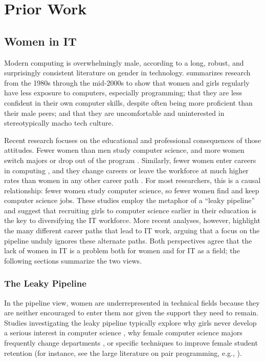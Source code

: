 \section{Prior Work}\label{lit-review}
\subsection{Women in IT}\label{lit-review-gender}
Modern computing is overwhelmingly male, according to a long, robust, and surprisingly consistent literature on gender in technology. \citet{Sanders2005Gender} summarizes research from the 1980s through the mid-2000s to show that women and girls regularly have less exposure to computers, especially programming; that they are less confident in their own computer skills, despite often being more proficient than their male peers; and that they are uncomfortable and uninterested in stereotypically macho tech culture.

Recent research focuses on the educational and professional consequences of those attitudes. Fewer women than men study computer science, and more women switch majors or drop out of the program \citep{Cohoon2006Just}. Similarly, fewer women enter careers in computing \citep{BartolAspray2006Transition}, and they change careers or leave the workforce at much higher rates than women in any other career path \citep{GlassEtAl2013Whats}. For most researchers, this is a causal relationship: fewer women study computer science, so fewer women find and keep computer science jobs. These studies employ the metaphor of a ``leaky pipeline'' \citep{Camp1997Incredible} and suggest that recruiting girls to computer science earlier in their education is the key to diversifying the IT workforce. More recent analyses, however, highlight the many different career paths that lead to IT work, arguing that a focus on the pipeline unduly ignores these alternate paths. Both perspectives agree that the lack of women in IT is a problem both for women and for IT as a field; the following sections summarize the two views.

\subsubsection{The Leaky Pipeline}
In the pipeline view, women are underrepresented in technical fields because they are neither encouraged to enter them nor given the support they need to remain. Studies investigating the leaky pipeline typically explore why girls never develop a serious interest in computer science \citep{BarkerEtAl2006Recruiting}, why female computer science majors frequently change departments \citep{KatzEtAl2006Traversing}, or specific techniques to improve female student retention (for instance, see the large literature on pair programming, e.g., \citealp{WernerEtAl2005Want, PorterEtAl2013Success}).

